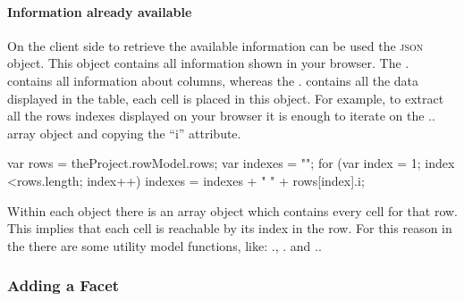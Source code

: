 \paragraph{Information already available} On the client side to retrieve the available information can be used the  \textsc{json} object. This object contains all information shown in your browser. The . contains all information about columns, whereas the . contains all the data displayed in the table, each cell is placed in this object. For example, to extract all the rows indexes displayed on your browser it is enough to iterate on the .. array object and copying the ``i'' attribute.
\begin{code}
var rows = theProject.rowModel.rows;
var indexes = "";
for (var index = 1; index <rows.length; index++)
   indexes = indexes + " " + rows[index].i;
\end{code}
Within each  object there is an array object  which contains every cell for that row. This implies that each cell is reachable by its index in the row. For this reason in the  there are some utility model functions, like: ., . and ..

\subsubsection{Adding a Facet}
